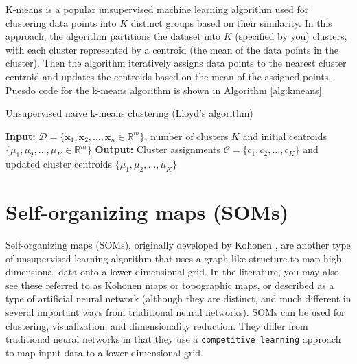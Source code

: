 \documentclass{article}[11pt]
\newcommand{\norm}[1]{\left|\left|#1\right|\right|}
\DeclareMathOperator*{\argmin}{arg\,min}
\begin{document}
K-means is a popular unsupervised machine learning algorithm used for clustering data points into $K$ distinct groups based on their similarity.
In this approach, the algorithm partitions the dataset into $K$ (specified by you) clusters, 
with each cluster represented by a centroid (the mean of the data points in the cluster). 
Then the algorithm iteratively assigns data points to the nearest cluster centroid and updates the centroids 
based on the mean of the assigned points.
Puesdo code for the k-means algorithm is shown in Algorithm \ref{alg:kmeans}.

\begin{algorithm}[H]
   \begin{algorithmic}
   \caption{Unsupervised naive k-means clustering (Lloyd's algorithm)}\label{alg:kmeans}
   \State \textbf{Input:} $\mathcal{D} = \{\mathbf{x}_1, \mathbf{x}_2, \ldots, \mathbf{x}_n\in\mathbb{R}^{m}\}$, number of clusters $K$ and initial centroids $\{\mu_1, \mu_2, \ldots, \mu_K\in\mathbb{R}^{m}\}$
   \State \textbf{Output:} Cluster assignments $\mathcal{C} = \{c_1, c_2, \ldots, c_K\}$ and updated cluster centroids $\{\mu_1, \mu_2, \ldots, \mu_K\}$
      \State{$c_{i}\gets\argmin_{j} \norm{\mathbf{x} - \mu_j}^2$}
   \EndFor 
   \Statex
   \State{$\hat{\mu}\gets\mu$}
   \EndFor
   \Statex
   \If{$\norm{\mu - \hat{\mu}} < \epsilon$}
   \EndIf
   \EndWhile
   \end{algorithmic}
\end{algorithm}


\section{Self-organizing maps (SOMs)}
Self-organizing maps (SOMs), originally developed by Kohonen \citep{Kohonen:1982aa}, are another type of unsupervised learning algorithm that uses a graph-like structure to map high-dimensional data onto a lower-dimensional grid.
In the literature, you may also see these referred to as Kohonen maps or topographic maps, or described as a type of artificial neural network
(although they are distinct, and much different in several important ways from traditional neural networks).
SOMs can be used for clustering, visualization, and dimensionality reduction. 
They differ from traditional neural networks in that they use a \texttt{competitive learning} approach 
to map input data to a lower-dimensional grid.
\end{document}

